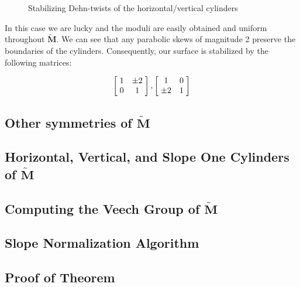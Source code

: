 \documentclass[]{article}
\begin{document}
\begin{figure}[H]
\centering

\caption{Stabilizing Dehn-twists of the horizontal/vertical cylinders}
\end{figure}

In this case we are lucky and the moduli are easily obtained and uniform throughout $\tilde{\mathbf{M}}$. We can see that any parabolic skews of magnitude 2 preserve the boundaries of the cylinders. Consequently, our surface is stabilized by the following matrices:

\begin{equation}
\left[ \hspace{1mm} \begin{matrix}
				1 & \pm 2\\
				0 & 1
			\end{matrix}\hspace{1mm}\right],
			\left[ \hspace{1mm} \begin{matrix}
							1 & 0\\
							\pm 2 & 1
						\end{matrix}\hspace{1mm}\right]
\end{equation}

\newpage
\subsection{Other symmetries of $\tilde{\mathbf{M}}$}

\subsection{Horizontal, Vertical, and Slope One Cylinders of $\tilde{\mathbf{M}}$}
\begin{figure}[H]
\centering

\end{figure}

\subsection{Computing the Veech Group of $\tilde{\mathbf{M}}$}
\subsection{Slope Normalization Algorithm}
\subsection{Proof of Theorem}
\end{document}
